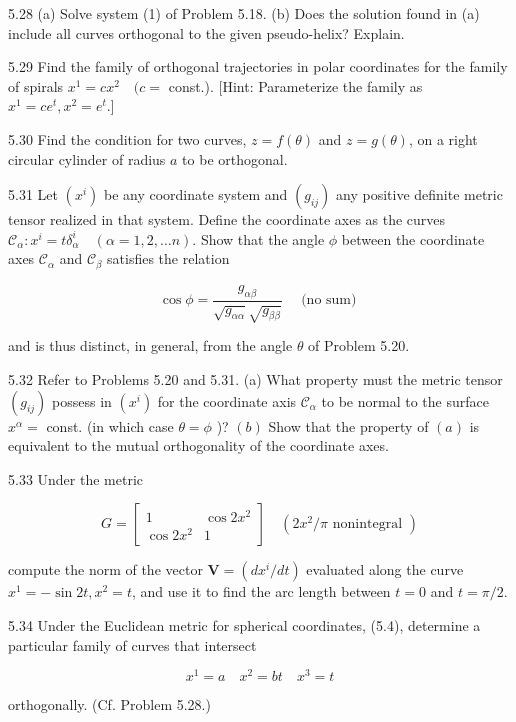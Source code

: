 \documentclass[10pt]{article}
\begin{document}
5.28 (a) Solve system (1) of Problem 5.18. (b) Does the solution found in (a) include all curves orthogonal to the given pseudo-helix? Explain.

5.29 Find the family of orthogonal trajectories in polar coordinates for the family of spirals $x^{1}=c x^{2} \quad(c=$ const.). [Hint: Parameterize the family as $x^{1}=c e^{t}, x^{2}=e^{t}$.]

5.30 Find the condition for two curves, $z=f(\theta)$ and $z=g(\theta)$, on a right circular cylinder of radius $a$ to be orthogonal.

5.31 Let $\left(x^{i}\right)$ be any coordinate system and $\left(g_{i j}\right)$ any positive definite metric tensor realized in that system. Define the coordinate axes as the curves $\mathscr{C}_{\alpha}: x^{i}=t \delta_{\alpha}^{i} \quad(\alpha=1,2, \ldots n)$. Show that the angle $\phi$ between the coordinate axes $\mathscr{C}_{\alpha}$ and $\mathscr{C}_{\beta}$ satisfies the relation

$$
\cos \phi=\frac{g_{\alpha \beta}}{\sqrt{g_{\alpha \alpha}} \sqrt{g_{\beta \beta}}} \quad \text { (no sum) }
$$

and is thus distinct, in general, from the angle $\theta$ of Problem 5.20.

5.32 Refer to Problems 5.20 and 5.31. (a) What property must the metric tensor $\left(g_{i j}\right)$ possess in $\left(x^{i}\right)$ for the coordinate axis $\mathscr{C}_{\alpha}$ to be normal to the surface $x^{\alpha}=$ const. (in which case $\theta=\phi$ )? $(b)$ Show that the property of $(a)$ is equivalent to the mutual orthogonality of the coordinate axes.

5.33 Under the metric

$$
G=\left[\begin{array}{cc}
1 & \cos 2 x^{2} \\
\cos 2 x^{2} & 1
\end{array}\right] \quad\left(2 x^{2} / \pi \text { nonintegral }\right)
$$

compute the norm of the vector $\mathbf{V}=\left(d x^{i} / d t\right)$ evaluated along the curve $x^{1}=-\sin 2 t, x^{2}=t$, and use it to find the arc length between $t=0$ and $t=\pi / 2$.

5.34 Under the Euclidean metric for spherical coordinates, (5.4), determine a particular family of curves that intersect

$$
x^{1}=a \quad x^{2}=b t \quad x^{3}=t
$$

orthogonally. (Cf. Problem 5.28.)
\end{document}
